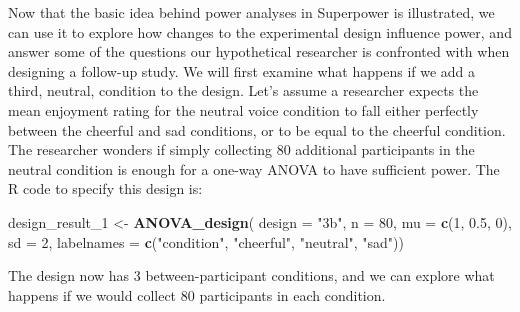 \documentclass[
  ,jou,floatsintext]{apa6}
\newenvironment{Shaded}{\begin{snugshade}}{\end{snugshade}}
\newcommand{\DataTypeTok}[1]{\textcolor[rgb]{0.13,0.29,0.53}{#1}}
\newcommand{\DecValTok}[1]{\textcolor[rgb]{0.00,0.00,0.81}{#1}}
\newcommand{\FloatTok}[1]{\textcolor[rgb]{0.00,0.00,0.81}{#1}}
\newcommand{\KeywordTok}[1]{\textcolor[rgb]{0.13,0.29,0.53}{\textbf{#1}}}
\newcommand{\NormalTok}[1]{#1}
\newcommand{\StringTok}[1]{\textcolor[rgb]{0.31,0.60,0.02}{#1}}
\begin{document}
Now that the basic idea behind power analyses in Superpower is illustrated, we can use it to explore how changes to the experimental design influence power, and answer some of the questions our hypothetical researcher is confronted with when designing a follow-up study.
We will first examine what happens if we add a third, neutral, condition to the design.
Let's assume a researcher expects the mean enjoyment rating for the neutral voice condition to fall either perfectly between the cheerful and sad conditions, or to be equal to the cheerful condition.
The researcher wonders if simply collecting 80 additional participants in the neutral condition is enough for a one-way ANOVA to have sufficient power.
The R code to specify this design is:

\begin{Shaded}
\begin{Highlighting}[]
\NormalTok{design_result_}\DecValTok{1}\NormalTok{ <-}\StringTok{ }\KeywordTok{ANOVA_design}\NormalTok{(}
  \DataTypeTok{design =} \StringTok{"3b"}\NormalTok{, }\DataTypeTok{n =} \DecValTok{80}\NormalTok{, }
  \DataTypeTok{mu =} \KeywordTok{c}\NormalTok{(}\DecValTok{1}\NormalTok{, }\FloatTok{0.5}\NormalTok{, }\DecValTok{0}\NormalTok{), }\DataTypeTok{sd =} \DecValTok{2}\NormalTok{, }
  \DataTypeTok{labelnames =} \KeywordTok{c}\NormalTok{(}\StringTok{"condition"}\NormalTok{, }
                 \StringTok{"cheerful"}\NormalTok{, }
                 \StringTok{"neutral"}\NormalTok{, }\StringTok{"sad"}\NormalTok{))}
\end{Highlighting}
\end{Shaded}

The design now has 3 between-participant conditions, and we can explore what happens if we would collect 80 participants in each condition.
\end{document}
